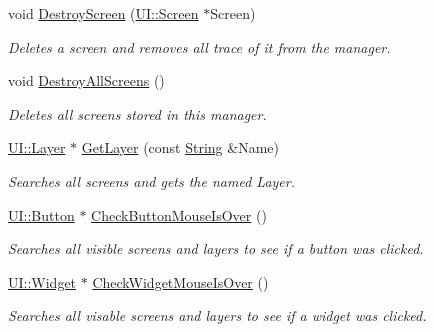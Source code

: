 \begin{DoxyCompactItemize}
void \hyperlink{classphys_1_1UIManager_a6c44c94905d7a01eb004efda66b53af8}{DestroyScreen} (\hyperlink{classphys_1_1UI_1_1Screen}{UI::Screen} $\ast$Screen)
\begin{DoxyCompactList}\small\item\em Deletes a screen and removes all trace of it from the manager. \item\end{DoxyCompactList}\item 
\hypertarget{classphys_1_1UIManager_a97555e02aad6c85cac6bf67fbe074cd1}{
void \hyperlink{classphys_1_1UIManager_a97555e02aad6c85cac6bf67fbe074cd1}{DestroyAllScreens} ()}
\label{classphys_1_1UIManager_a97555e02aad6c85cac6bf67fbe074cd1}

\begin{DoxyCompactList}\small\item\em Deletes all screens stored in this manager. \item\end{DoxyCompactList}\item 
\hyperlink{classphys_1_1UI_1_1Layer}{UI::Layer} $\ast$ \hyperlink{classphys_1_1UIManager_ab51c45a1ac2cbc6a4f1d826d1407ed65}{GetLayer} (const \hyperlink{namespacephys_aa03900411993de7fbfec4789bc1d392e}{String} \&Name)
\begin{DoxyCompactList}\small\item\em Searches all screens and gets the named Layer. \item\end{DoxyCompactList}\item 
\hyperlink{classphys_1_1UI_1_1Button}{UI::Button} $\ast$ \hyperlink{classphys_1_1UIManager_aa1022fcbe8e1efc7a383b2eff834a152}{CheckButtonMouseIsOver} ()
\begin{DoxyCompactList}\small\item\em Searches all visible screens and layers to see if a button was clicked. \item\end{DoxyCompactList}\item 
\hyperlink{classphys_1_1UI_1_1Widget}{UI::Widget} $\ast$ \hyperlink{classphys_1_1UIManager_ab9840b483409d3453a67931b4d858d1b}{CheckWidgetMouseIsOver} ()
\begin{DoxyCompactList}\small\item\em Searches all visable screens and layers to see if a widget was clicked. \item\end{DoxyCompactList}\item 

\end{DoxyCompactItemize}
